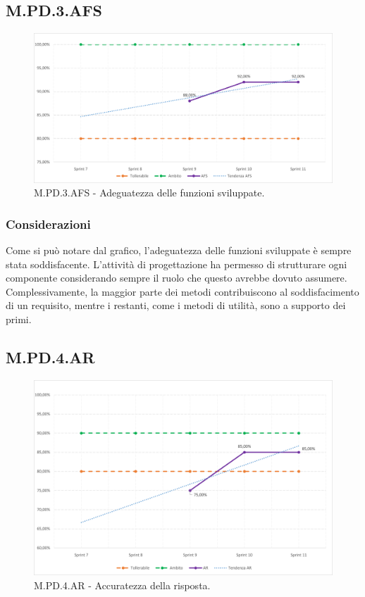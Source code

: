 \documentclass[10pt, a4paper]{article}
\begin{document}
\subsection{M.PD.3.AFS}
\begin{figure}[H] \includegraphics[width=15.5cm]{img/metriche/MPD3AFS.png} \caption{M.PD.3.AFS - Adeguatezza delle funzioni sviluppate.} \end{figure}
\subsubsection{Considerazioni}
Come si può notare dal grafico, l'adeguatezza delle funzioni sviluppate è sempre stata soddisfacente. L'attività di progettazione ha permesso di strutturare ogni componente considerando sempre il ruolo che questo avrebbe dovuto assumere. Complessivamente, la maggior parte dei metodi contribuiscono al soddisfacimento di un requisito, mentre i restanti, come i metodi di utilità, sono a supporto dei primi.

\subsection{M.PD.4.AR}
\begin{figure}[H] \includegraphics[width=15.5cm]{img/metriche/MPD4AR.png} \caption{M.PD.4.AR - Accuratezza della risposta.} \end{figure}
\end{document}
